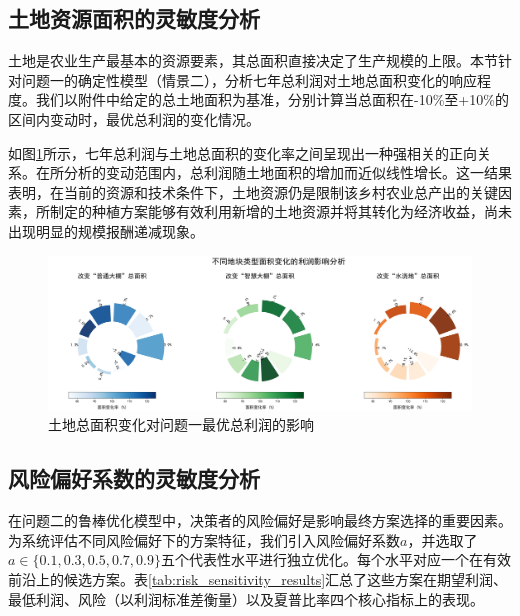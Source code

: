 \subsection{土地资源面积的灵敏度分析}

土地是农业生产最基本的资源要素，其总面积直接决定了生产规模的上限。本节针对问题一的确定性模型（情景二），分析七年总利润对土地总面积变化的响应程度。我们以附件中给定的总土地面积为基准，分别计算当总面积在-10\%至+10\%的区间内变动时，最优总利润的变化情况。

如图\ref{fig:land_sensitivity}所示，七年总利润与土地总面积的变化率之间呈现出一种强相关的正向关系。在所分析的变动范围内，总利润随土地面积的增加而近似线性增长。这一结果表明，在当前的资源和技术条件下，土地资源仍是限制该乡村农业总产出的关键因素，所制定的种植方案能够有效利用新增的土地资源并将其转化为经济收益，尚未出现明显的规模报酬递减现象。

\begin{figure}[H]
    \centering
    \includegraphics[width=\textwidth]{figs/6灵敏度分析/第一问地块灵敏度圆弧图.png}
    \caption{土地总面积变化对问题一最优总利润的影响}
    \label{fig:land_sensitivity}
\end{figure}


\subsection{风险偏好系数的灵敏度分析}

在问题二的鲁棒优化模型中，决策者的风险偏好是影响最终方案选择的重要因素。为系统评估不同风险偏好下的方案特征，我们引入风险偏好系数$a$，并选取了$a \in \{0.1, 0.3, 0.5, 0.7, 0.9\}$五个代表性水平进行独立优化。每个水平对应一个在有效前沿上的候选方案。表\ref{tab:risk_sensitivity_results}汇总了这些方案在期望利润、最低利润、风险（以利润标准差衡量）以及夏普比率四个核心指标上的表现。

